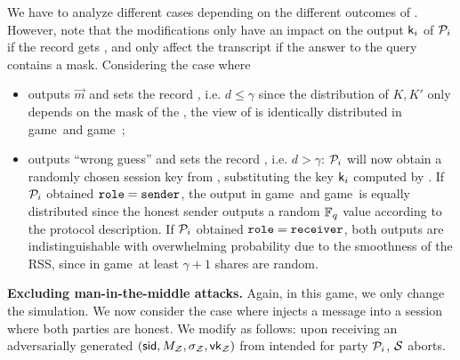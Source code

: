 \begin{games}
We have to analyze different cases depending on the different outcomes of \TestPwd. 
However, note that the modifications only have an impact on the output $\mathsf{k}_{i}$ of $\mathcal{P}_{i}$ if the record gets , and only affect the transcript if the answer to the \TestPwd query contains a mask. Considering the case where \TestPwd
\begin{itemize}
	\item outputs $\vec{m}$ and sets the record , i.e. $d\leq\gamma$ since the distribution of $K,K'$ only depends on the mask of the \passwords, the view of \Env is identically distributed in game~\thisgame and game~\previousgame;
\item outputs ``wrong guess'' and sets the record , i.e. $d> \gamma$: $\mathcal{P}_{i}$ will now obtain a randomly chosen session key from \Func, substituting the key $\mathsf{k}_{i}$ computed by \Sim. If $\mathcal{P}_{i}$ obtained $\texttt{role}=\texttt{sender}$, the output in game~\thisgame and game~\previousgame is equally distributed since the honest sender outputs a random $\mathbb{F}_q$ value according to the protocol description. If $\mathcal{P}_{i}$ obtained $\texttt{role}=\texttt{receiver}$, both outputs are indistinguishable with overwhelming probability due to the smoothness of the RSS, since in game~\previousgame at least $\gamma +1 $ shares are random.
\end{itemize}
 
\textbf{Excluding man-in-the-middle attacks.}
Again, in this game, we only change the simulation. We now consider the case where \Env injects a message into a session where both parties are honest. We modify \Sim as follows: upon receiving an adversarially generated $(\mathsf{sid},M_\mathcal{Z},\sigma_\mathcal{Z},\mathsf{vk}_\mathcal{Z})$ from \Env intended for party $\mathcal{P}_{i}$, $\mathcal{S}$ aborts.


\end{games}
